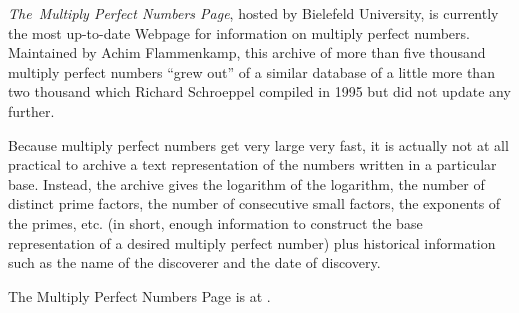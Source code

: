 \documentclass[12pt]{article}
\begin{document}
{\em The~Multiply Perfect Numbers Page}, hosted by Bielefeld University, is currently the most up-to-date Webpage for information on multiply perfect numbers. Maintained by Achim Flammenkamp, this archive of more than five thousand multiply perfect numbers ``grew out'' of a similar database of a little more than two thousand which Richard Schroeppel compiled in 1995 but did not update any further.

Because multiply perfect numbers get very large very fast, it is actually not at all practical to archive a text representation of the numbers written in a particular base. Instead, the archive gives the logarithm of the logarithm, the number of distinct prime factors, the number of consecutive small factors, the exponents of the primes, etc. (in short, enough information to construct the base representation of a desired multiply perfect number) plus historical information such as the name of the discoverer and the date of discovery.

The Multiply Perfect Numbers Page is at .
\end{document}
